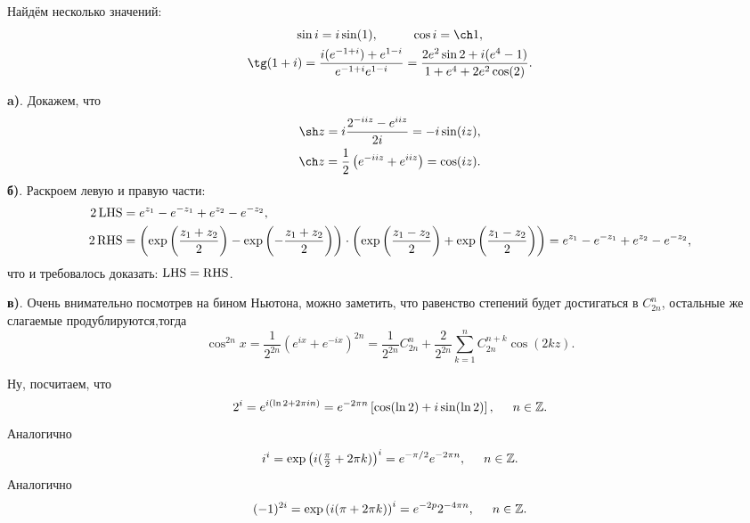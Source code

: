 
Найдём несколько значений:
\begin{gather*}
    \sin i = i \sin (1), 
    \hspace{10 mm} 
    \cos i = \ch 1,
    \\
    \tg(1 + i) =  
    \frac{i (e^{-1 + i}) + e^{1-i}}{e^{-1 + i} e^{1-i}}
    = \frac{2 e^2 \sin 2 + i(e^4-1)}{1 + e^4 + 2 e^2 \cos(2)}.
\end{gather*}



\textbf{a)}. Докажем, что
\begin{align*}
    \sh z = i \frac{2^{- i i z} - e^{i i z}}{2 i} = - i \sin(i z), \\
    \ch z = \frac{1}{2}\left(e^{- iiz} + e^{iiz}\right) = \cos(iz).
\end{align*}
\textbf{б)}. Раскроем левую и правую части:
\begin{align*}
    2 \mathop{\mathrm{LHS}}\nolimits &= e^{z_1} - e^{- z_1} + e^{z_2} - e^{-z_2}, \\
    2 \mathop{\mathrm{RHS}}\nolimits &= \left(
        \exp\left(\frac{z_1 + z_2}{2}\right) - \exp\left(- \frac{z_1 + z_2}{2}\right) \right)
        \cdot \left(
            \exp\left(\frac{z_1 - z_2}{2}\right)  + \exp\left(
                \frac{z_1 - z_2}{2}
            \right)
    \right) = e^{z_1} - e^{- z_1} + e^{z_2} - e^{-z_2},
\end{align*}
что и требовалось доказать: $\mathop{\mathrm{LHS}}\nolimits = \mathop{\mathrm{RHS}}\nolimits$.

\textbf{в)}. Очень внимательно посмотрев на бином Ньютона, можно заметить, что равенство степений будет достигаться в $C^n_{2n}$, остальные же слагаемые продублируются,тогда
\begin{equation*}
    \cos^{2n} x = 
    \frac{1}{2^{2n}}\left(e^{ix} + e^{-ix}\right)^{2n} = 
    \frac{1}{2^{2n}} C_{2n}^n + \frac{2}{2^{2n}} \sum_{k=1}^{n} C_{2n}^{n+k} \cos (2 k z).
\end{equation*}




Ну, посчитаем, что
\begin{equation*}
    2^i = e^{i (\ln 2 + 2 \pi i n)} =  e^{- 2\pi n}\left[\cos (\ln 2) + i \sin (\ln 2)\right]
    , \hspace{5 mm} 
    n \in \mathbb{Z}.
\end{equation*}
Аналогично
\begin{equation*}
    i^i = \exp\left(i (\tfrac{\pi}{2} + 2 \pi k)\right)^i = e^{- \pi /2} e^{- 2 \pi n},
    \hspace{5 mm} 
    n \in \mathbb{Z}.
\end{equation*}
Аналогично
\begin{equation*}
    (-1)^{2 i} = \exp\left(i (\pi  + 2 \pi k)\right)^i = e^{-2 p} 2^{- 4 \pi n},
    \hspace{5 mm} 
    n \in \mathbb{Z}.
\end{equation*}


